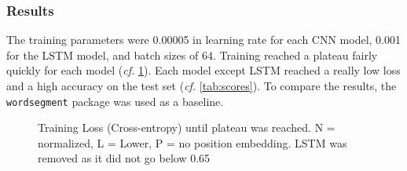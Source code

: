 \documentclass{jdmdh}
\begin{document}
\subsubsection{Results}

The training parameters were 0.00005 in learning rate for each CNN model, 0.001 for the LSTM model, and batch sizes of 64. Training reached a plateau fairly quickly for each model (\textit{cf.} \ref{fig:loss}). Each model except LSTM reached a really low loss and a high accuracy on the test set (\textit{cf.} \ref{tab:scores}). To compare the results, the \texttt{wordsegment} package \citet{WordSegment} was used as a baseline.

\begin{figure}[!ht]
  \begin{center}
    \caption{Training Loss (Cross-entropy) until plateau was reached. N = normalized, L = Lower, P = no position embedding. LSTM was removed as it did not go below 0.65}
  \label{fig:loss}
  \end{center}
\end{figure}
\end{document}
